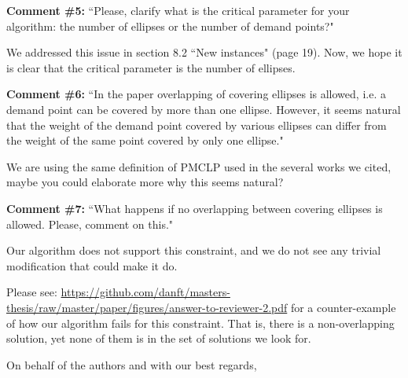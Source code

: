 \begin{letter}{}
		\textbf{Comment \#5:} ``Please, clarify what is the critical parameter for your algorithm: the number of ellipses or the number of demand points?"
		
		We addressed this issue in section 8.2 ``New instances" (page 19). Now, we hope it is clear that the critical parameter is the number of ellipses.
		
		\textbf{Comment \#6:} ``In the paper overlapping of covering ellipses is allowed, i.e. a demand point can be covered by more than one ellipse. However, it seems natural that the weight of the demand point covered by various ellipses can differ from the weight of the same point covered by only one ellipse."
		
		We are using the same definition of PMCLP used in the several works we cited, maybe you could elaborate more why this seems natural?
		
		\textbf{Comment \#7:} ``What happens if no overlapping between covering ellipses is allowed. Please, comment on this."
		
		Our algorithm does not support this constraint, and we do not see any trivial modification that could make it do.
		
		Please see: \href{https://github.com/danft/masters-thesis/raw/master/paper/figures/answer-to-reviewer-2.pdf}{https://github.com/danft/masters-thesis/raw/master/paper/figures/answer-to-reviewer-2.pdf} for a counter-example of how our algorithm fails for this constraint. That is, there is a non-overlapping solution, yet none of them is in the set of solutions we look for.
		
		\closing{On behalf of the authors and with our best regards,}
			\end{letter}